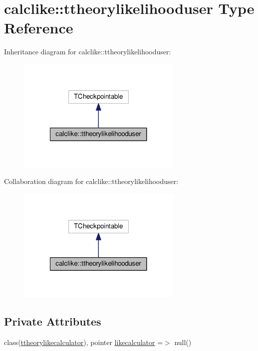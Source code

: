 \hypertarget{structcalclike_1_1ttheorylikelihooduser}{}\section{calclike\+:\+:ttheorylikelihooduser Type Reference}
\label{structcalclike_1_1ttheorylikelihooduser}


Inheritance diagram for calclike\+:\+:ttheorylikelihooduser\+:
\nopagebreak
\begin{figure}[H]
\begin{center}
\leavevmode
\includegraphics[width=224pt]{structcalclike_1_1ttheorylikelihooduser__inherit__graph}
\end{center}
\end{figure}


Collaboration diagram for calclike\+:\+:ttheorylikelihooduser\+:
\nopagebreak
\begin{figure}[H]
\begin{center}
\leavevmode
\includegraphics[width=224pt]{structcalclike_1_1ttheorylikelihooduser__coll__graph}
\end{center}
\end{figure}
\subsection*{Private Attributes}
\begin{DoxyCompactItemize}
\item 
class(\mbox{\hyperlink{structcalclike_1_1ttheorylikecalculator}{ttheorylikecalculator}}), pointer \mbox{\hyperlink{structcalclike_1_1ttheorylikelihooduser_a048eb30d08fb48e7f01ac21b888d6dbf}{likecalculator}} =$>$ null()
\end{DoxyCompactItemize}



